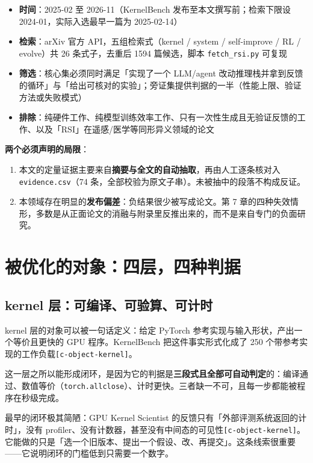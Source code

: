 \begin{itemize}
  \item \textbf{时间}：2025-02 至 2026-11（KernelBench 发布至本文撰写前；检索下限设 2024-01，实际入选最早一篇为 2025-02-14）
  \item \textbf{检索}：arXiv 官方 API，五组检索式（kernel / system / self-improve / RL / evolve）共 26 条式子，去重后 1594 篇候选，脚本 \texttt{fetch\_rsi.py} 可复现
  \item \textbf{筛选}：核心集必须同时满足「实现了一个 LLM/agent 改动推理栈并拿到反馈的循环」与「给出可核对的实验」；旁证集提供判据的一半（性能上限、验证方法或失败模式）
  \item \textbf{排除}：纯硬件工作、纯模型训练效率工作、只有一次性生成且无验证反馈的工作、以及「RSI」在遥感/医学等同形异义领域的论文
\end{itemize}

 \textbf{两个必须声明的局限}：


\begin{enumerate}
  \item 本文的定量证据主要来自\textbf{摘要与全文的自动抽取}，再由人工逐条核对入 \texttt{evidence.csv}（74 条，全部校验为原文子串）。未被抽中的段落不构成反证。
  \item 本领域存在明显的\textbf{发布偏差}：负结果很少被写成论文。第 7 章的四种失效情形，多数是从正面论文的消融与附录里反推出来的，而不是来自专门的负面研究。
\end{enumerate}

\section{被优化的对象：四层，四种判据}

\subsection{kernel 层：可编译、可验算、可计时}

kernel 层的对象可以被一句话定义：给定 PyTorch 参考实现与输入形状，产出一个等价且更快的 GPU 程序。KernelBench 把这件事实形式化成了 250 个带参考实现的工作负载{\scriptsize\texttt{[c-\hspace{0pt}object-\hspace{0pt}kernel]}}。


这一层之所以能形成闭环，是因为它的判据是\textbf{三段式且全部可自动判定}的：编译通过、数值等价（\texttt{torch.allclose}）、计时更快。三者缺一不可，且每一步都能被程序在秒级完成。


最早的闭环极其简陋：GPU Kernel Scientist 的反馈只有「外部评测系统返回的计时」，没有 profiler、没有计数器，甚至没有中间态的可见性{\scriptsize\texttt{[c-\hspace{0pt}object-\hspace{0pt}kernel]}}。它能做的只是「选一个旧版本、提出一个假设、改、再提交」。这条线索很重要——它说明闭环的门槛低到只需要一个数字。


